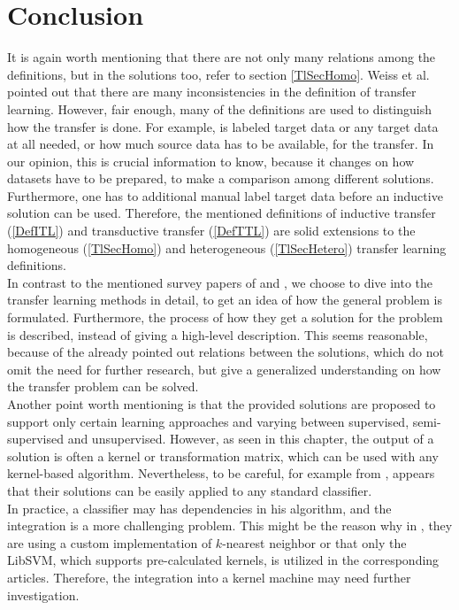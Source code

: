 \section{Conclusion}
It is again worth mentioning that there are not only many relations among the definitions, but in the solutions too, refer to section \ref{TlSecHomo}.
Weiss et al. pointed out that there are many inconsistencies in the definition of transfer learning.\cite[p. 5-6]{Weiss.2016}
However, fair enough, many of the definitions are used to distinguish how the transfer is done.
For example, is labeled target data or any target data at all needed, or how much source data has to be available, for the transfer.
In our opinion, this is crucial information to know, because it changes on how datasets have to be prepared, to make a comparison among different solutions.
Furthermore, one has to additional manual label target data before an inductive solution can be used.
Therefore, the mentioned definitions of inductive transfer (\ref{DefITL}) and transductive transfer (\ref{DefTTL}) are solid extensions to the homogeneous (\ref{TlSecHomo}) and heterogeneous (\ref{TlSecHetero}) transfer learning definitions.\\
In contrast to the mentioned survey papers of \cite{Weiss.2016} and \cite{Pan.2010}, we choose to dive into the transfer learning methods in detail, to get an idea of how the general problem is formulated.
Furthermore, the process of how they get a solution for the problem is described, instead of giving a high-level description.
This seems reasonable, because of the already pointed out relations between the solutions, which do not omit the need for further research, but give a generalized understanding on how the transfer problem can be solved.\\
Another point worth mentioning is that the provided solutions are proposed to support only certain learning approaches and varying between supervised, semi-supervised and unsupervised.
However, as seen in this chapter, the output of a solution is often a kernel or transformation matrix, which can be used with any kernel-based algorithm.
Nevertheless, to be careful, for example from \cite{Long.}, \cite{Long.2015} \cite{Gong.} appears that their solutions can be easily applied to any standard classifier.\\
In practice, a classifier may has dependencies in his algorithm, and the integration is a more challenging problem.
This might be the reason why in \cite{Gong.}, they are using a custom implementation of $k$-nearest neighbor or that only the LibSVM, which supports pre-calculated kernels, is utilized in the corresponding articles. 
Therefore, the integration into a kernel machine may need further investigation.